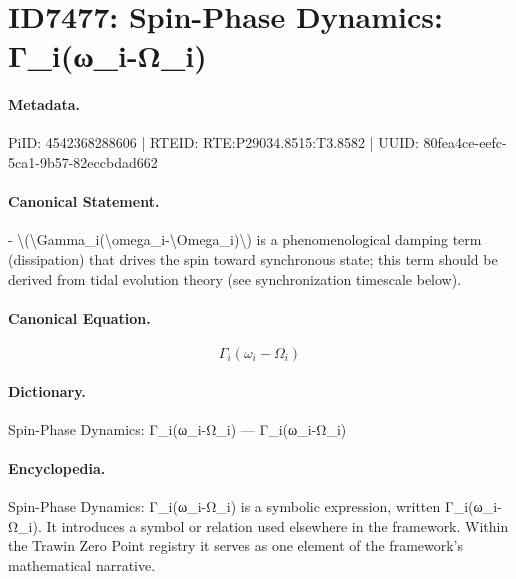 \section*{ID7477: Spin-Phase Dynamics: Γ\_i(ω\_i-Ω\_i)}
\paragraph{Metadata.}
PiID: 4542368288606 | RTEID: RTE:P29034.8515:T3.8582 | UUID: 80fea4ce-eefc-5ca1-9b57-82eccbdad662

\paragraph{Canonical Statement.}
- \textbackslash{}(\textbackslash{}Gamma\_i(\textbackslash{}omega\_i-\textbackslash{}Omega\_i)\textbackslash{}) is a phenomenological damping term (dissipation) that drives the spin toward synchronous state; this term should be derived from tidal evolution theory (see synchronization timescale below).

\paragraph{Canonical Equation.}
\[
\Gamma_i(\omega_i-\Omega_i)
\]

\paragraph{Dictionary.}
Spin-Phase Dynamics: Γ\_i(ω\_i-Ω\_i) — Γ\_i(ω\_i-Ω\_i)

\paragraph{Encyclopedia.}
Spin-Phase Dynamics: Γ\_i(ω\_i-Ω\_i) is a symbolic expression, written Γ\_i(ω\_i-Ω\_i). It introduces a symbol or relation used elsewhere in the framework. Within the Trawin Zero Point registry it serves as one element of the framework's mathematical narrative.
